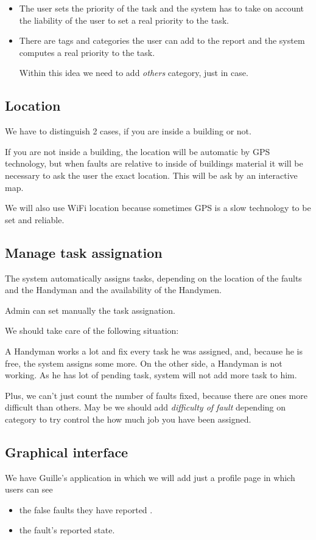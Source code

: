 \documentclass{article}
\newcommand{\tbg}{Handyman\xspace}
\newcommand{\tbgs}{Handymen\xspace}
\begin{document}
\begin{itemize}
\item The user sets the priority of the task and the system has to take on account the liability of the user to set a real priority to the task.

\item There are tags and categories the user can add to the report and the system computes a real priority to the task.

Within this idea we need to add \textit{others} category, just in case.
\end{itemize}

\subsection{Location}

We have to distinguish 2 cases, if you are inside a building or not.

If you are not inside a building, the location will be automatic by GPS technology, but when faults are relative to inside of buildings material it will be necessary to ask the user the exact location. This will be ask by an interactive map.


We will also use WiFi location because sometimes GPS is a slow technology to be set and reliable.

\subsection{Manage task assignation}
The system automatically assigns tasks, depending on the location of the faults and the \tbg and the availability of the \tbgs.

Admin can set manually the task assignation.

We should take care of the following situation:

A \tbg works a lot and fix every task he was assigned, and, because he is free, the system assigns some more. On the other side, a \tbg is not working. As he has lot of pending task, system will not add more task to him. 

Plus, we can't just count the number of faults fixed, because there are ones more difficult than others. May be we should add \textit{difficulty of fault} depending on category to try control the how much job you have been assigned.

\subsection{Graphical interface}
We have Guille's application in which we will add just a profile page in which users can see
\begin{itemize}
\item the false faults they have reported .
\item the fault's reported state.
\end{itemize}
\end{document}
